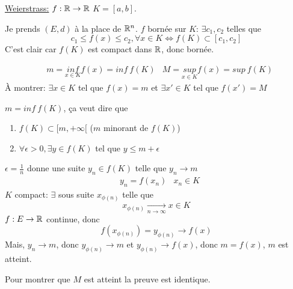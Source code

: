 \begin{preuve}
    \underline{Weierstrass:} $f: \mathbb{R} \to \mathbb{R}$ $K = [a, b]$. \par
    Je prends  $(E, d)$ à la place de  $\mathbb{R}^n$. $f$ bornée sur  $K$:  $\exists c_1, c_2$ telles que 
    \[
    c_1 \le f(x) \le c_2, \forall x \in K \iff f(K) \subset [c_1, c_2] 
\] 
    C'est clair car $f(K)$ est compact dans  $\mathbb{R}$, donc  bornée.
    \par
    \begin{align*}
        &m = \underset{x \in K}{inf} f(x) = inf \: f(K) &M = \underset{x \in K}{sup} f(x) = sup \: f(K)
    \end{align*}
    À montrer: $\exists x \in K$ tel que $f(x) = m$ et  $\exists x' \in K$ tel que $f(x') = M$
    \par
     $m = inf \: f(K)$, ça veut dire que 
      \begin{enumerate}
          \item $f(K) \subset [m, +\infty[$ ($m$ minorant de  $f(K)$)
          \item $\forall \epsilon > 0, \exists y \in f(K)$ tel que $y \le m + \epsilon$
     \end{enumerate}
     $\epsilon = \frac{1}{n}$ donne une suite $y_n \in f(K)$ telle que $y_n \to m$
     \begin{align*}
         &y_n = f(x_n) &x_n \in K
     \end{align*}
     $K$ compact:   $\exists$ sous suite     $x_{\phi(n)}$ telle que 
      \[
      x_{\phi(n)} \xrightarrow[n \to \infty]{} x \in K
      \] 
     $f: E \to \mathbb{R}$ continue, donc 
     \[
         f(x_{\phi(n)}) = y_{\phi(n)} \to f(x) 
     \] 
     Mais, $y_n \to m$, donc $y_{\phi(n)} \to m$ et $y_{\phi(n)} \to f(x)$, donc $m = f(x)$,  $m$ est atteint.
     \par
     Pour montrer que $M$ est atteint la preuve est identique.
\end{preuve}

